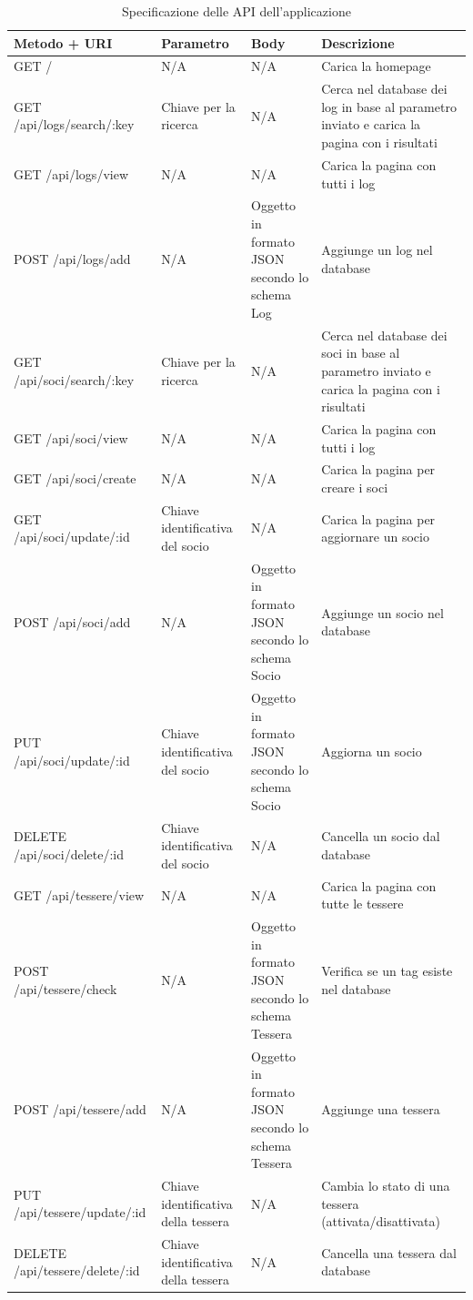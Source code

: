 \documentclass[12pt]{report}
\begin{document}
\vspace*{35px} 
\begin{table}[H]
	\scriptsize
	\centering
	\def\tabularxcolumn#1{m{#1}}
	\renewcommand\arraystretch{1.8}
	\renewcommand\tabcolsep{3.0pt}
	\begin{tabularx}{\textwidth}{|L|L|L|L|}
		\hline
		\textbf{Metodo + URI} & \textbf{Parametro} & \textbf{Body} & \textbf{Descrizione} \\
		\hline                              
		GET / & N/A & N/A & Carica la homepage \\ 
		\hline
		GET /api/logs/search/:key & Chiave per la ricerca & N/A 
		& Cerca nel database dei log in base al parametro inviato e carica la pagina con i risultati \\
		\hline
		GET /api/logs/view & N/A & N/A & Carica la pagina con tutti i log \\
		\hline  
		POST /api/logs/add & N/A & Oggetto in formato JSON secondo lo schema Log & Aggiunge un log nel database \\
		\hline
		GET /api/soci/search/:key & Chiave per la ricerca & N/A & Cerca nel database dei soci in base al parametro inviato e carica la pagina con i risultati \\ 
		\hline
		GET /api/soci/view & N/A & N/A & Carica la pagina con tutti i log \\ 
		\hline
		GET /api/soci/create & N/A & N/A & Carica la pagina per creare i soci \\ 
		\hline
		GET /api/soci/update/:id & Chiave identificativa del socio & N/A & Carica la pagina per aggiornare un socio \\ 
		\hline
		POST /api/soci/add & N/A & Oggetto in formato JSON secondo lo schema Socio & Aggiunge un socio nel database \\ 
		\hline
		PUT /api/soci/update/:id & Chiave identificativa del socio & Oggetto in formato JSON secondo lo schema Socio & Aggiorna un socio \\ 
		\hline
		DELETE /api/soci/delete/:id & Chiave identificativa del socio & N/A & Cancella un socio dal database \\ 
		\hline
		GET /api/tessere/view & N/A & N/A & Carica la pagina con tutte le tessere \\ 
		\hline
		POST /api/tessere/check & N/A & Oggetto in formato JSON secondo lo schema Tessera & Verifica se un tag esiste nel database \\
		\hline
		POST /api/tessere/add & N/A & Oggetto in formato JSON secondo lo schema Tessera & Aggiunge una tessera \\ 
		\hline
		PUT /api/tessere/update/:id & Chiave identificativa della tessera & N/A & Cambia lo stato di una tessera (attivata/disattivata) \\ 
		\hline
		DELETE /api/tessere/delete/:id & Chiave identificativa della tessera & N/A & Cancella una tessera dal database \\ 
		\hline
	\end{tabularx}
	\caption{Specificazione delle API dell'applicazione}
	\label{tab:api}
\end{table}
\end{document}
